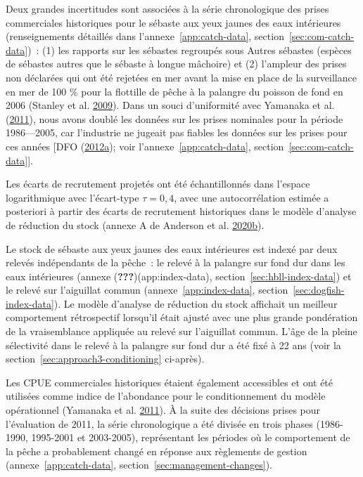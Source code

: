 \documentclass[french,11pt]{book}
\begin{document}
Deux grandes incertitudes sont associées à la série chronologique des prises commerciales historiques pour le sébaste aux yeux jaunes des eaux intérieures (renseignements détaillés dans l'annexe~\ref{app:catch-data}, section~\ref{sec:com-catch-data})~: (1) les rapports sur les sébastes regroupés sous Autres sébastes (espèces de sébastes autres que le sébaste à longue mâchoire) et (2) l'ampleur des prises non déclarées qui ont été rejetées en mer avant la mise en place de la surveillance en mer de 100 \% pour la flottille de pêche à la palangre du poisson de fond en 2006 (Stanley et al. \protect\hyperlink{ref-stanley2009}{2009}). Dans un souci d'uniformité avec Yamanaka et al. (\protect\hyperlink{ref-yamanaka2011}{2011}), nous avons doublé les données sur les prises nominales pour la période 1986---2005, car l'industrie ne jugeait pas fiables les données sur les prises pour ces années {[}DFO (\protect\hyperlink{ref-dfo2012}{2012}\protect\hyperlink{ref-dfo2012}{a}); voir l'annexe~\ref{app:catch-data}, section~\ref{sec:com-catch-data}{]}.

Les écarts de recrutement projetés ont été échantillonnés dans l'espace logarithmique avec l'écart-type \(\tau = 0,4\), avec une autocorrélation estimée a posteriori à partir des écarts de recrutement historiques dans le modèle d'analyse de réduction du stock (annexe A de Anderson et al. \protect\hyperlink{ref-anderson2020gfmp}{2020}\protect\hyperlink{ref-anderson2020gfmp}{b}).

Le stock de sébaste aux yeux jaunes des eaux intérieures est indexé par deux relevés indépendants de la pêche~: le relevé à la palangre sur fond dur dans les eaux intérieures (annexe ({\textbf{???}})(app:index-data), section~\ref{sec:hbll-index-data}) et le relevé sur l'aiguillat commun (annexe~\ref{app:index-data}, section~\ref{sec:dogfish-index-data}). Le modèle d'analyse de réduction du stock affichait un meilleur comportement rétrospectif lorsqu'il était ajusté avec une plus grande pondération de la vraisemblance appliquée au relevé sur l'aiguillat commun. L'âge de la pleine sélectivité dans le relevé à la palangre sur fond dur a été fixé à 22 ans (voir la section~\ref{sec:approach3-conditioning} ci-après).

Les CPUE commerciales historiques étaient également accessibles et ont été utilisées comme indice de l'abondance pour le conditionnement du modèle opérationnel (Yamanaka et al. \protect\hyperlink{ref-yamanaka2011}{2011}). À la suite des décisions prises pour l'évaluation de 2011, la série chronologique a été divisée en trois phases (1986-1990, 1995-2001 et 2003-2005), représentant les périodes où le comportement de la pêche a probablement changé en réponse aux règlements de gestion (annexe~\ref{app:catch-data}, section~\ref{sec:management-changes}).
\end{document}
